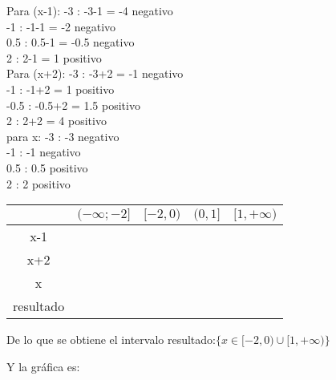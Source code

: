     Para (x-1):
    -3 : -3-1 = -4 negativo\\
    -1 : -1-1 = -2 negativo\\
    0.5 : 0.5-1 = -0.5 negativo\\
    2  : 2-1 = 1 positivo\\

    Para (x+2):
    -3 : -3+2 = -1 negativo\\
    -1 : -1+2 = 1 positivo\\
    -0.5 : -0.5+2 = 1.5 positivo \\
    2 : 2+2 = 4 positivo\\

    para x:
    -3 : -3 negativo\\
    -1 : -1 negativo\\
    0.5 : 0.5 positivo\\
    2 : 2 positivo\\

\vspace*{1cm}
    \begin{tabular}{|c|c|c|c|c|}
        \hline
            &$ (-\infty;-2]$&   $[-2,0)$ &$ (0,1] $ &$[1,+\infty)$\\\hline
        x-1 &  \n   & \n    & \n    & \p \\\hline
        x+2 & \n    & \p    & \p    & \p \\\hline
        x   & \n    & \n    & \p    & \p \\\hline
    resultado& \n   & \p    & \n    & \p \\\hline
    \end{tabular}
    \vspace*{1cm}

    De lo que se obtiene el intervalo resultado:$ \{x\in  [-2,0) \cup [1,+\infty) \}$

    Y la gráfica es:


